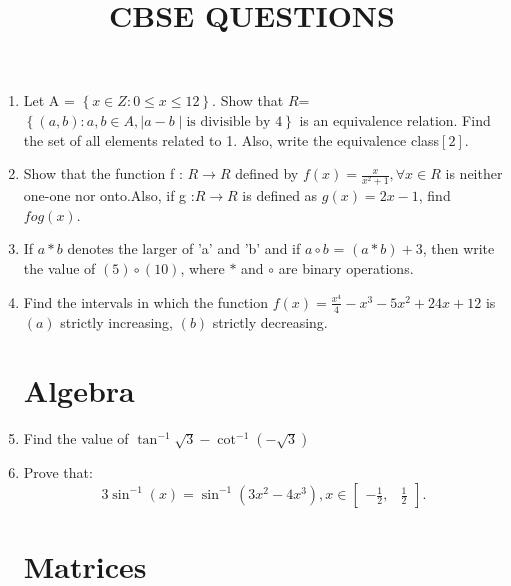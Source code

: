 \documentclass{article}
\providecommand{\sbrak}[1]{\ensuremath{{}\left[#1\right]}}
\providecommand{\brak}[1]{\ensuremath{\left(#1\right)}}
\providecommand{\cbrak}[1]{\ensuremath{\left\{#1\right\}}}
\begin{document}
\title{\textbf{CBSE QUESTIONS}}
\date{}
\maketitle{}
\begin{enumerate}
\section{Functions}

\item Let A = $\cbrak{x \in Z: 0\le x \le 12}$. Show that $R$=$\cbrak{\brak{a,b}: a,b \in A,\mid a-b \mid \text{is divisible by } 4 }$ is an equivalence relation. Find the set of all elements related to 1. Also, write the equivalence class\sbrak 2.
\item Show that the function f : \(R \longrightarrow R\) defined by $f\brak{x} = \frac{x}{x^2 + 1} , \forall x \in R $ is neither one-one nor onto.Also, if g :\(R\longrightarrow R\) is defined as $ g\brak{x} =2x - 1$, find $fog (x)$.
\item If $a \ast b$ denotes the larger of 'a' and 'b' and if $a \circ b$ = $ \brak{a \ast b}+ 3$, then write the value of $ \brak{5} \circ \brak{10} $, where $\ast$ and $\circ$ are binary operations.  
\item Find the intervals in which the function $f\brak{x} =\frac{x^{4}}{4}-x^{3}-5x^{2} + 24x + 12$ is \brak{a} strictly increasing, \brak{b} strictly decreasing.	
\section{Algebra}
\item Find the value of $\tan^{-1}\sqrt{3}-\cot^{-1}\brak{-\sqrt{3}}$
\item Prove that:\[3\sin^{-1}\brak{x}=\sin^{-1}\brak{3x^{2}-4x^{3}}, x \in \begin{bmatrix}
		-\frac{1}{2}, & \frac{1}{2} \end{bmatrix}. \]

\section{Matrices}


\end{enumerate}
\end{document}
